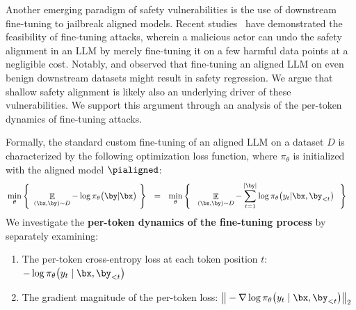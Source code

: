 
Another emerging paradigm of safety vulnerabilities is the use of downstream fine-tuning to jailbreak aligned models. Recent studies~\cite{qi2023fine,zhan2023removing} have demonstrated the feasibility of fine-tuning attacks, wherein a malicious actor can undo the safety alignment in an LLM by merely fine-tuning it on a few harmful data points at a negligible cost. Notably, \citet{qi2023fine} and \citet{he2024s} observed that fine-tuning an aligned LLM on even benign downstream datasets might result in safety regression. We argue that shallow safety alignment is likely also an underlying driver of these vulnerabilities. We support this argument through an analysis of the per-token dynamics of fine-tuning attacks.

Formally, the standard custom fine-tuning of an aligned LLM on a dataset $D$ is characterized by the following optimization loss function, where $\pi_{\theta}$ is initialized with the aligned model $\pialigned$:
 \begin{align}
     & \min_{\theta} \Bigg\{\ \mathop{\mathbb E}_{(\bx,\by)\sim D}  - \log \pi_{\theta}\big(\by|\bx\big) \ \Bigg\} \ \ = \ \  \min_{\theta} \Bigg\{\ \ \mathop{\mathbb E}_{(\bx,\by)\sim D}  - \sum_{t=1}^{|\by|} \log \pi_{\theta}\big(y_t|\bx, \by_{<t}\big)\ \ \Bigg\}
 \label{eqn:sft}
 \end{align}
 We investigate the \textbf{per-token dynamics of the fine-tuning process} by separately examining:
 \begin{enumerate}
     \item The per-token cross-entropy loss at each token position $t$: $-\log \pi_{\theta}\big(y_t \mid \bx, \by_{<t}\big)$ 
     \item The gradient magnitude of the per-token loss: $\big\|-\nabla \log \pi_{\theta}\big(y_t \mid \bx, \by_{<t}\big)\big\|_2$
 \end{enumerate}
 
